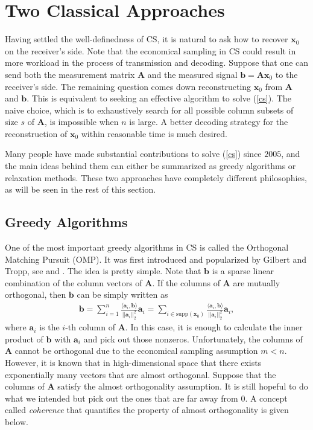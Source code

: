 \documentclass[11pt]{article}
\numberwithin{equation}{section}
\theoremstyle{plain}
\theoremstyle{definition}
\def\A{{\mathbf A}}
\def\x{{\mathbf x}}
\def\b{{\mathbf b}}
\def\a{{\mathbf a}}
\begin{document}
 
\section{Two Classical Approaches}

Having settled the well-definedness of CS, it is natural to ask how to recover $\x_0$ on the receiver's side. Note that the economical sampling in CS could result in more workload in the process of transmission and decoding. Suppose that one can send both the measurement matrix $\A$ and the measured signal $\b=\A\x_0$ to the receiver's side. The remaining question comes down reconstructing $\x_0$ from $\A$ and $\b$. This is equivalent to seeking an effective algorithm to solve (\ref{cs}). The naive choice, which is to exhaustively search for all possible column subsets of size $s$ of $\A$, is impossible when $n$ is large. A better decoding strategy for the reconstruction of $\x_0$ within reasonable time is much desired. 

Many people have made substantial  contributions to solve (\ref{cs}) since $2005$, and the main ideas behind them can either be summarized as greedy algorithms or relaxation methods. These two approaches have completely different philosophies, as will be seen in the rest of this section.

\subsection{Greedy Algorithms}

One of the most important greedy algorithms in CS is called the Orthogonal Matching Pursuit (OMP). It was first introduced and popularized by Gilbert and Tropp, see \cite{tropp2004greed} and \cite{tropp2007signal}. The idea is pretty simple. Note that $\b$ is a sparse linear combination of the column vectors of $\A$. If the columns of $\A$ are mutually orthogonal, then $\b$ can be simply written as 
\begin{align*}
\b=\sum_{i=1}^n\frac{\langle\a_i, \b\rangle}{||\a_i||_2^2}\a_i=\sum_{i\in\text{supp}(\x_0)}\frac{\langle\a_i, \b\rangle}{||\a_i||_2^2}\a_i, 
\end{align*} 
where $\a_i$ is the $i$-th column of $\A$. In this case, it is enough to calculate the inner product of $\b$ with $\a_i$ and pick out those nonzeros. Unfortunately, the columns of $\A$ cannot be orthogonal due to the economical sampling assumption $m<n$. However, it is known that in high-dimensional space that there exists exponentially many vectors that are almost orthogonal. Suppose that the columns of $\A$ satisfy the almost orthogonality assumption. It is still hopeful to do what we intended but pick out the ones that are far away from $0$. A concept called \emph{coherence} that quantifies the property of almost orthogonality is given below.
\end{document}
